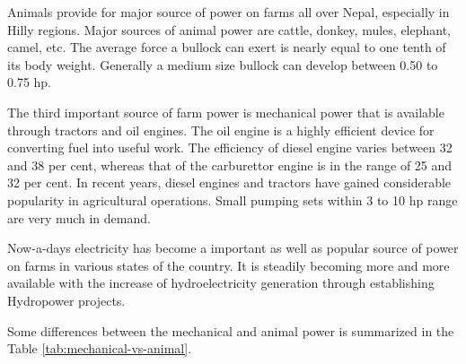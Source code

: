 \documentclass[11pt,]{book}
\newlength{\drop}
\theoremstyle{definition}
\theoremstyle{definition}
\theoremstyle{definition}
\theoremstyle{remark}
\begin{document}
Animals provide for major source of power on farms all over Nepal,
especially in Hilly regions. Major sources of animal power are cattle,
donkey, mules, elephant, camel, etc. The average force a bullock can
exert is nearly equal to one tenth of its body weight. Generally a
medium size bullock can develop between 0.50 to 0.75 hp.

The third important source of farm power is mechanical power that is
available through tractors and oil engines. The oil engine is a highly
efficient device for converting fuel into useful work. The efficiency of
diesel engine varies between 32 and 38 per cent, whereas that of the
carburettor engine is in the range of 25 and 32 per cent. In recent
years, diesel engines and tractors have gained considerable popularity
in agricultural operations. Small pumping sets within 3 to 10 hp range
are very much in demand.

Now-a-days electricity has become a important as well as popular source
of power on farms in various states of the country. It is steadily
becoming more and more available with the increase of hydroelectricity
generation through establishing Hydropower projects.

Some differences between the mechanical and animal power is summarized
in the Table \ref{tab:mechanical-vs-animal}.
\end{document}
